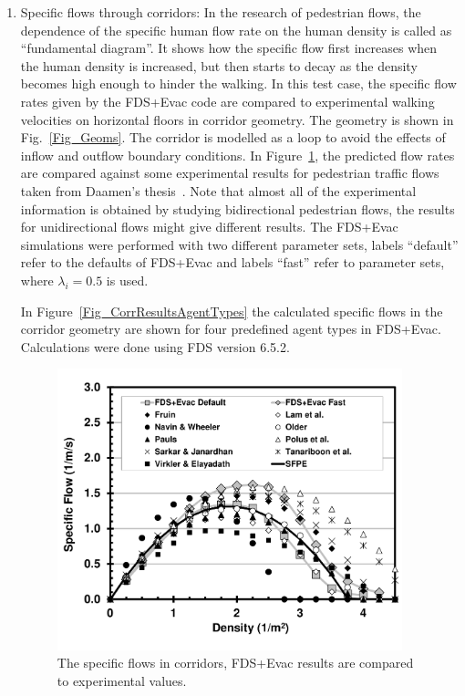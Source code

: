\documentclass[12pt,a4paper,final,twoside]{stylevk}
\begin{document}
%
\begin{enumerate}
%
\item Specific flows through corridors: In the research of pedestrian
  flows, the dependence of the specific human flow rate on the human
  density is called as ``fundamental diagram''.  It shows how the
  specific flow first increases when the human density is increased,
  but then starts to decay as the density becomes high enough to
  hinder the walking.  In this test case, the specific flow rates
  given by the FDS+Evac code are compared to experimental walking
  velocities on horizontal floors in corridor geometry.  The geometry
  is shown in Fig.~\ref{Fig_Geoms}.  The corridor is modelled as a
  loop to avoid the effects of inflow and outflow boundary conditions.
  In Figure~\ref{Fig_CorrResults}, the predicted flow rates are
  compared against some experimental results for pedestrian traffic
  flows taken from Daamen's thesis~\cite{Daamen04}.  Note that almost
  all of the experimental information is obtained by studying
  bidirectional pedestrian flows, the results for unidirectional flows
  might give different results.  The FDS+Evac simulations were
  performed with two different parameter sets, labels ``default''
  refer to the defaults of FDS+Evac and labels ``fast'' refer to
  parameter sets, where $\lambda_i = 0.5$ is used.

  In Figure~\ref{Fig_CorrResultsAgentTypes} the calculated specific
  flows in the corridor geometry are shown for four predefined
  agent types in FDS+Evac.  Calculations were done using FDS version 6.5.2.

%
\begin{figure}[!tb]
  \centerline{\includegraphics[clip=true,
  width=100mm]{FIGURES/CorrFlow_2m_Results}} 
  \caption{The specific flows in corridors, FDS+Evac results are
    compared to experimental values.}\label{Fig_CorrResults} 
\end{figure}
%


\end{enumerate}
\end{document}
